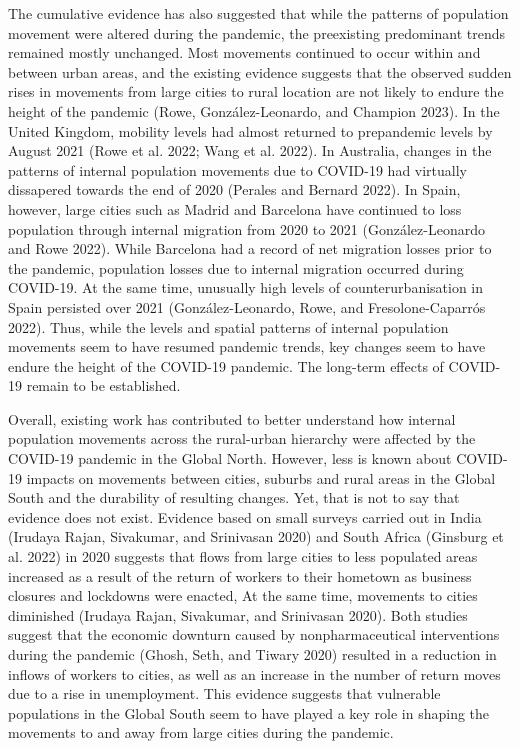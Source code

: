 \documentclass[
  11pt,
]{article}
\begin{document}
The cumulative evidence has also suggested that while the patterns of
population movement were altered during the pandemic, the preexisting
predominant trends remained mostly unchanged. Most movements continued
to occur within and between urban areas, and the existing evidence
suggests that the observed sudden rises in movements from large cities
to rural location are not likely to endure the height of the pandemic
(Rowe, González-Leonardo, and Champion 2023). In the United Kingdom,
mobility levels had almost returned to prepandemic levels by August 2021
(Rowe et al. 2022; Wang et al. 2022). In Australia, changes in the
patterns of internal population movements due to COVID-19 had virtually
dissapered towards the end of 2020 (Perales and Bernard 2022). In Spain,
however, large cities such as Madrid and Barcelona have continued to
loss population through internal migration from 2020 to 2021
(González-Leonardo and Rowe 2022). While Barcelona had a record of net
migration losses prior to the pandemic, population losses due to
internal migration occurred during COVID-19. At the same time, unusually
high levels of counterurbanisation in Spain persisted over 2021
(González-Leonardo, Rowe, and Fresolone-Caparrós 2022). Thus, while the
levels and spatial patterns of internal population movements seem to
have resumed pandemic trends, key changes seem to have endure the height
of the COVID-19 pandemic. The long-term effects of COVID-19 remain to be
established.

Overall, existing work has contributed to better understand how internal
population movements across the rural-urban hierarchy were affected by
the COVID-19 pandemic in the Global North. However, less is known about
COVID-19 impacts on movements between cities, suburbs and rural areas in
the Global South and the durability of resulting changes. Yet, that is
not to say that evidence does not exist. Evidence based on small surveys
carried out in India (Irudaya Rajan, Sivakumar, and Srinivasan 2020) and
South Africa (Ginsburg et al. 2022) in 2020 suggests that flows from
large cities to less populated areas increased as a result of the return
of workers to their hometown as business closures and lockdowns were
enacted, At the same time, movements to cities diminished (Irudaya
Rajan, Sivakumar, and Srinivasan 2020). Both studies suggest that the
economic downturn caused by nonpharmaceutical interventions during the
pandemic (Ghosh, Seth, and Tiwary 2020) resulted in a reduction in
inflows of workers to cities, as well as an increase in the number of
return moves due to a rise in unemployment. This evidence suggests that
vulnerable populations in the Global South seem to have played a key
role in shaping the movements to and away from large cities during the
pandemic.
\end{document}
